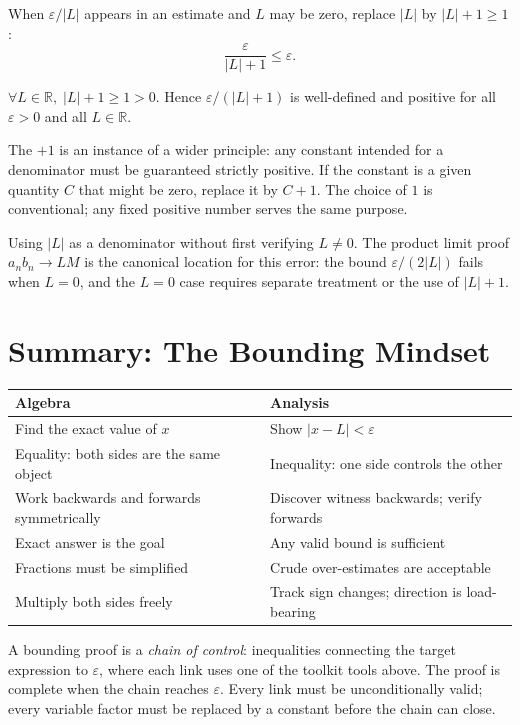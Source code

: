 When $\varepsilon/|L|$ appears in an estimate and $L$ may be zero, replace
$|L|$ by $|L|+1\geq 1$:
\[
  \frac{\varepsilon}{|L|+1}\leq\varepsilon.
\]

\begin{remark}
$\forall L\in\mathbb{R},\;|L|+1\geq 1>0$. Hence
$\varepsilon/(|L|+1)$ is well-defined and positive for all $\varepsilon>0$
and all $L\in\mathbb{R}$.
\end{remark}

\begin{remark}[Generalisation]
The $+1$ is an instance of a wider principle: any constant intended for a
denominator must be guaranteed strictly positive. If the constant is a
given quantity $C$ that might be zero, replace it by $C+1$. The choice of
$1$ is conventional; any fixed positive number serves the same purpose.
\end{remark}

\begin{remark}
Using $|L|$ as a denominator without first verifying $L\neq 0$. The product
limit proof $a_nb_n\to LM$ is the canonical location for this error: the
bound $\varepsilon/(2|L|)$ fails when $L=0$, and the $L=0$ case requires
separate treatment or the use of $|L|+1$.
\end{remark}

\section*{Summary: The Bounding Mindset}

\medskip
\begin{tabular}{@{}ll@{}}
\toprule
\textbf{Algebra} & \textbf{Analysis} \\
\midrule
Find the exact value of $x$
  & Show $|x-L|<\varepsilon$ \\
Equality: both sides are the same object
  & Inequality: one side controls the other \\
Work backwards and forwards symmetrically
  & Discover witness backwards; verify forwards \\
Exact answer is the goal
  & Any valid bound is sufficient \\
Fractions must be simplified
  & Crude over-estimates are acceptable \\
Multiply both sides freely
  & Track sign changes; direction is load-bearing \\
\bottomrule
\end{tabular}
\medskip

\begin{remark}
A bounding proof is a \emph{chain of control}: inequalities connecting the
target expression to $\varepsilon$, where each link uses one of the toolkit
tools above. The proof is complete when the chain reaches $\varepsilon$.
Every link must be unconditionally valid; every variable factor must be
replaced by a constant before the chain can close.
\end{remark}
